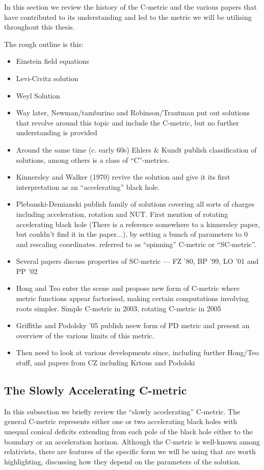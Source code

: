 \documentclass[
twoside,openright,frontopenright]{dmathesis}
\begin{document}
In this section we review the history of the C-metric and the various papers
that have contributed to its understanding and led to the metric we will be
utilising throughout this thesis.


The rough outline is this:
\begin{itemize}
\item Einstein field equations
\item Levi-Civita solution
\item Weyl Solution
\item Way later, Newman/tamburino and Robinson/Trautman put out solutions that
  revolve around this topic and include the C-metric, but no further
  understanding is provided
\item Around the same time (c. early 60s) Ehlers \& Kundt publish classification
  of solutions, among others is a class of ``C''-metrics.
\item Kinnersley and Walker (1970) revive the solution and give it its first
  interpretation as an ``accelerating'' black hole.
\item Plebanski-Demianski publish family of solutions covering all sorts of
  charges including acceleration, rotation and NUT. First mention of rotating
  accelerating black hole (There is a reference somewhere to a kinnersley paper,
  but couldn't find it in the paper...), by setting a bunch of parameters to 0
  and rescaling coordinates. referred to as ``spinning'' C-metric or
  ``SC-metric''.
\item Several papers discuss properties of SC-metric --- FZ '80, BP '99, LO '01
  and PP '02
\item Hong and Teo enter the scene and propose new form of C-metric where metric
  functions appear factorised, making certain computations involving roots
  simpler. Simple C-metric in 2003, rotating C-metric in 2005
\item Griffiths and Podolsky '05 publish neew form of PD metric and present an
  overview of the various limits of this metric.
\item Then need to look at various developments since, including further
  Hong/Teo stuff, and papers from CZ including Krtous and Podolski
\end{itemize}


\subsection{The Slowly Accelerating C-metric}

In this subsection we briefly review the ``slowly accelerating'' C-metric.  The
general C-metric
\cite{Kinnersley:1970zw,Plebanski:1976gy,Dias:2002mi,Griffiths:2005qp}
represents either one or two accelerating black holes with unequal conical
deficits extending from each pole of the black hole either to the boundary or an
acceleration horizon. Although the C-metric is well-known among relativists,
there are features of the specific form we will be using that are worth
highlighting, discussing how they depend on the parameters of the solution.
\end{document}
